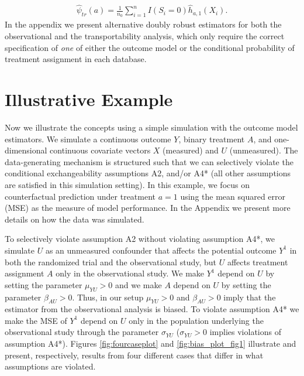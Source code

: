 \documentclass[11pt]{article}
\DeclareMathOperator{\E}{\textnormal{\mbox{E}}}
\begin{document}
\begin{align*}
    \widehat\psi_{tr}(a) = \frac{1}{n_0} \sum_{i=1}^n I(S_i=0 ) \widehat h_{a,1}(X_i).
\end{align*}
In the appendix we present alternative doubly robust estimators for both the observational and the transportability analysis, which only require the correct specification of \textit{one} of either the outcome model or the conditional probability of treatment assignment in each database.






 

\section*{Illustrative Example}

Now we illustrate the concepts using a simple simulation with the outcome model estimators. We simulate a continuous outcome $Y$, binary treatment $A$, and one-dimensional continuous covariate vectors $X$ (measured) and $U$ (unmeasured). The data-generating mechanism is structured such that we can selectively violate the conditional exchangeability assumptions A2, and/or A4* (all other assumptions are satisfied in this simulation setting). In this example, we focus on counterfactual prediction under treatment $a=1$ using the mean squared error (MSE) as the measure of model performance. In the Appendix we present more details on how the data was simulated.

To selectively violate assumption A2 without violating assumption A4*, we simulate $U$ as an unmeasured confounder that affects the potential outcome $Y^1$ in both the randomized trial and the observational study, but $U$ affects treatment assignment $A$ only in the observational study. We make $Y^1$ depend on $U$ by setting the parameter $\mu_{YU}>0$ and we make $A$ depend on $U$ by setting the parameter $\beta_{AU} > 0$. Thus, in our setup $\mu_{YU} >0$ and $\beta_{AU} >0$ imply that the estimator from the observational analysis is biased. To violate assumption A4* we make the MSE of $Y^1$ depend on $U$ only in the population underlying the observational study through the parameter $\sigma_{YU}$ ($\sigma_{YU}>0$ implies violations of assumption A4*). Figures \ref{fig:fourcaseplot} and \ref{fig:bias_plot_fig1} illustrate and present, respectively, results from  four different cases that differ in what assumptions are violated.
\end{document}
